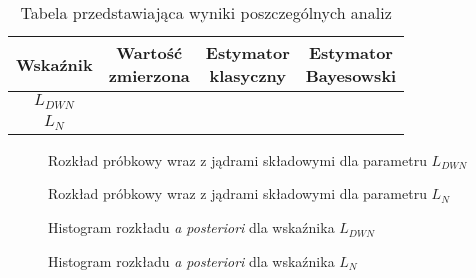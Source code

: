 \documentclass[polish,a4paper,11pt]{mwart}
\begin{document}
  \begin{table}[!tbh]
    \centering
    \caption{Tabela przedstawiająca wyniki poszczególnych analiz}
    \begin{tabular}{|c|c|c|c|}
      \hline
      Wskaźnik & \makecell{Wartość \\ zmierzona} & \makecell{Estymator \\ klasyczny} & \makecell{Estymator \\ Bayesowski} \\
      \hline
      $L_{DWN}$ & & & \\
      \hline
      $L_N$ & & & \\
      \hline
    \end{tabular}
    \label{tab:wyniki}
  \end{table}
    
    \begin{figure}
      \centering
      
      \caption{Rozkład próbkowy wraz z jądrami składowymi dla parametru $L_{DWN}$}
      \label{plot:kernel_ldwn}
    \end{figure}
    
    \begin{figure}
      \centering
      
      \caption{Rozkład próbkowy wraz z jądrami składowymi dla parametru $L_{N}$}
      \label{plot:kernel_ln}
    \end{figure}
    
    \begin{figure}
      \centering
      
      \caption{Histogram rozkładu \textit{a posteriori} dla wskaźnika $L_{DWN}$}
      \label{plot:hist_ldwn}
    \end{figure}

    \begin{figure}
      \centering
      
      \caption{Histogram rozkładu \textit{a posteriori} dla wskaźnika $L_{N}$}
      \label{plot:hist_ldwn}
    \end{figure}
\end{document}

